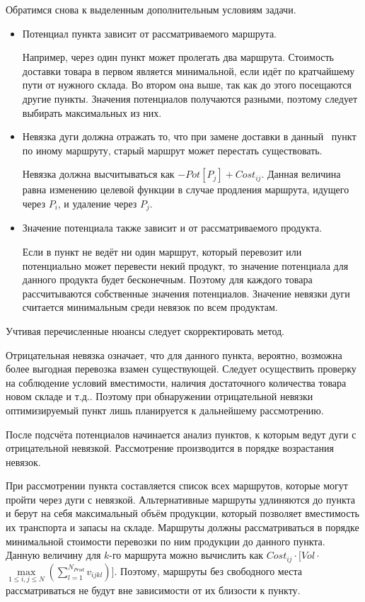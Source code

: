 	Обратимся снова к выделенным дополнительным условиям задачи.
	\begin{itemize}
		\item Потенциал пункта зависит от рассматриваемого маршрута.
		
		Например, через один пункт может пролегать два маршрута. Стоимость доставки товара в первом является минимальной, если идёт по кратчайшему пути от нужного склада. Во втором она выше, так как до этого посещаются другие пункты. Значения потенциалов получаются разными, поэтому следует выбирать максимальных из них.
		
		\item Невязка дуги должна отражать то, что при замене доставки в данный \, пункт по иному маршруту, старый маршрут может перестать существовать.
		
		Невязка должна высчитываться как $-Pot[P_j] + Cost_{ij}$. Данная величина равна изменению целевой функции в случае продления маршрута, идущего через $P_i$, и удаление через $P_j$.
		
		\item Значение потенциала также зависит и от рассматриваемого продукта.
		
		Если в пункт не ведёт ни один маршрут, который перевозит или потенциально может перевести некий продукт, то значение потенциала для данного продукта будет бесконечным. Поэтому для каждого товара рассчитываются собственные значения потенциалов. Значение невязки дуги считается минимальным среди невязок по всем продуктам.
	\end{itemize}

	Учтивая перечисленные нюансы следует скорректировать метод.
	
	Отрицательная невязка означает, что для данного пункта, вероятно, возможна более выгодная перевозка взамен существующей. Следует осуществить проверку на соблюдение условий вместимости, наличия достаточного количества товара новом складе и т.д.. Поэтому при обнаружении отрицательной невязки оптимизируемый пункт лишь планируется к дальнейшему рассмотрению.
	
	После подсчёта потенциалов начинается анализ пунктов, к которым ведут дуги с отрицательной невязкой. Рассмотрение производится в порядке возрастания невязок. 
	
	При рассмотрении пункта составляется список всех маршрутов, которые могут пройти через дуги с невязкой. Альтернативные маршруты удлиняются до пункта и берут на себя максимальный объём продукции, который позволяет вместимость их транспорта и запасы на складе\cite{potential:transit}. Маршруты должны рассматриваться в порядке минимальной стоимости перевозки по ним продукции до данного пункта. Данную величину для $k$-го маршрута можно вычислить как $Cost_{ij} \cdot [Vol \cdot $\(\max\limits_{1 \leq i, j \leq N}\)$ (\sum_{l=1}^{N_{Prod}} v_{ijkl})]$. Поэтому, маршруты без свободного места рассматриваться не будут вне зависимости от их близости к пункту\cite{potential:polyprod}. 
	
